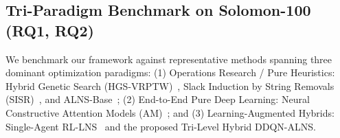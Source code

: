 \documentclass{ieeeaccess}
\begin{document}
\subsection{Tri-Paradigm Benchmark on Solomon-100 (RQ1, RQ2)}
\label{sec:solomon_results}

We benchmark our framework against representative methods spanning three dominant optimization paradigms: (1) Operations Research / Pure Heuristics: Hybrid Genetic Search (HGS-VRPTW)~\cite{vidal2013hybrid}, Slack Induction by String Removals (SISR)~\cite{christiaens2020slack}, and ALNS-Base~\cite{pisinger2007general}; (2) End-to-End Pure Deep Learning: Neural Constructive Attention Models (AM)~\cite{kool2019attention,falkner2020learning}; and (3) Learning-Augmented Hybrids: Single-Agent RL-LNS~\cite{lu2020learning} and the proposed Tri-Level Hybrid DDQN-ALNS.
\end{document}
